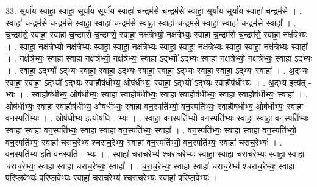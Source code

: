\documentclass[17pt]{extarticle}
\begin{document}
33. सूर्या॑य॒ स्वाहा॒ स्वाहा॒ सूर्या॑य॒ सूर्या॑य॒ स्वाहा॑ च॒न्द्रम॑से च॒न्द्रम॑से॒ स्वाहा॒ सूर्या॑य॒ सूर्या॑य॒ स्वाहा॑ च॒न्द्रम॑से । . स्वाहा॑ च॒न्द्रम॑से च॒न्द्रम॑से॒ स्वाहा॒ स्वाहा॑ च॒न्द्रम॑से॒ स्वाहा॒ स्वाहा॑ च॒न्द्रम॑से॒ स्वाहा॒ स्वाहा॑ च॒न्द्रम॑से॒ स्वाहा᳚ । . च॒न्द्रम॑से॒ स्वाहा॒ स्वाहा॑ च॒न्द्रम॑से च॒न्द्रम॑से॒ स्वाहा॒ नक्ष॑त्रेभ्यो॒ नक्ष॑त्रेभ्यः॒ स्वाहा॑ च॒न्द्रम॑से च॒न्द्रम॑से॒ स्वाहा॒ नक्ष॑त्रेभ्यः । . स्वाहा॒ नक्ष॑त्रेभ्यो॒ नक्ष॑त्रेभ्यः॒ स्वाहा॒ स्वाहा॒ नक्ष॑त्रेभ्यः॒ स्वाहा॒ स्वाहा॒ नक्ष॑त्रेभ्यः॒ स्वाहा॒ स्वाहा॒ नक्ष॑त्रेभ्यः॒ स्वाहा᳚ । . नक्ष॑त्रेभ्यः॒ स्वाहा॒ स्वाहा॒ नक्ष॑त्रेभ्यो॒ नक्ष॑त्रेभ्यः॒ स्वाहा॒ ऽद्भ्यो᳚ ऽद्भ्यः स्वाहा॒ नक्ष॑त्रेभ्यो॒ नक्ष॑त्रेभ्यः॒ स्वाहा॒ ऽद्भ्यः । . स्वाहा॒ ऽद्भ्यो᳚ ऽद्भ्यः स्वाहा॒ स्वाहा॒ ऽद्भ्यः स्वाहा॒ स्वाहा॒ ऽद्भ्यः स्वाहा॒ स्वाहा॒ ऽद्भ्यः स्वाहा᳚ । . अ॒द्भ्यः स्वाहा॒ स्वाहा॒ ऽद्भ्यो᳚ ऽद्भ्यः स्वाहौष॑धीभ्य॒ ओष॑धीभ्यः॒ स्वाहा॒ ऽद्भ्यो᳚ ऽद्भ्यः स्वाहौष॑धीभ्यः । . अ॒द्भ्य इत्य॑त् - भ्यः । . स्वाहौष॑धीभ्य॒ ओष॑धीभ्यः॒ स्वाहा॒ स्वाहौष॑धीभ्यः॒ स्वाहा॒ स्वाहौष॑धीभ्यः॒ स्वाहा॒ स्वाहौष॑धीभ्यः॒ स्वाहा᳚ । . ओष॑धीभ्यः॒ स्वाहा॒ स्वाहौष॑धीभ्य॒ ओष॑धीभ्यः॒ स्वाहा॒ वन॒स्पति॑भ्यो॒ वन॒स्पति॑भ्यः॒ स्वाहौष॑धीभ्य॒ ओष॑धीभ्यः॒ स्वाहा॒ वन॒स्पति॑भ्यः । . ओष॑धीभ्य॒ इत्योष॑धि - भ्यः॒ । . स्वाहा॒ वन॒स्पति॑भ्यो॒ वन॒स्पति॑भ्यः॒ स्वाहा॒ स्वाहा॒ वन॒स्पति॑भ्यः॒ स्वाहा॒ स्वाहा॒ वन॒स्पति॑भ्यः॒ स्वाहा॒ स्वाहा॒ वन॒स्पति॑भ्यः॒ स्वाहा᳚ । . वन॒स्पति॑भ्यः॒ स्वाहा॒ स्वाहा॒ वन॒स्पति॑भ्यो॒ वन॒स्पति॑भ्यः॒ स्वाहा॑ चराच॒रेभ्य॑ श्चराच॒रेभ्यः॒ स्वाहा॒ वन॒स्पति॑भ्यो॒ वन॒स्पति॑भ्यः॒ स्वाहा॑ चराच॒रेभ्यः॑ । . वन॒स्पति॑भ्य॒ इति॒ वन॒स्पति॑ - भ्यः॒ । . स्वाहा॑ चराच॒रेभ्य॑ श्चराच॒रेभ्यः॒ स्वाहा॒ स्वाहा॑ चराच॒रेभ्यः॒ स्वाहा॒ स्वाहा॑ चराच॒रेभ्यः॒ स्वाहा॒ स्वाहा॑ चराच॒रेभ्यः॒ स्वाहा᳚ । . च॒रा॒च॒रेभ्यः॒ स्वाहा॒ स्वाहा॑ चराच॒रेभ्य॑ श्चराच॒रेभ्यः॒ स्वाहा॑ परिप्ल॒वेभ्यः॑ परिप्ल॒वेभ्यः॒ स्वाहा॑ चराच॒रेभ्य॑ श्चराच॒रेभ्यः॒ स्वाहा॑ परिप्ल॒वेभ्यः॑ । \newline
\end{document}
